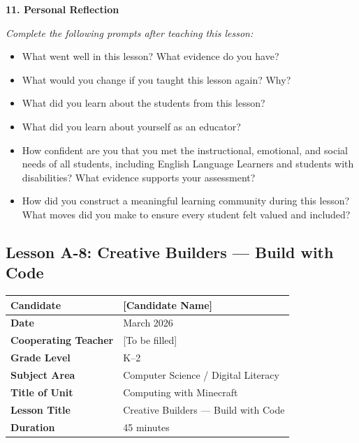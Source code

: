 \documentclass[11pt,letterpaper]{article}
\begin{document}
\textbf{11. Personal Reflection}

\textit{Complete the following prompts after teaching this lesson:}

\begin{itemize}
  \item What went well in this lesson? What evidence do you have?

  \item What would you change if you taught this lesson again? Why?

  \item What did you learn about the students from this lesson?

  \item What did you learn about yourself as an educator?

  \item How confident are you that you met the instructional, emotional, and social needs of all students, including English Language Learners and students with disabilities? What evidence supports your assessment?

  \item How did you construct a meaningful learning community during this lesson? What moves did you make to ensure every student felt valued and included?
\end{itemize}

\newpage
\subsection{Lesson A-8: Creative Builders --- Build with Code}
\label{sub:LessonA8CreativeBuildersBuildwithCode}

\begin{longtable}{|L{0.28\textwidth}|L{0.65\textwidth}|}
\hline
\textbf{Candidate}  & [Candidate Name]  \\
\hline
\textbf{Date}  & March 2026  \\
\hline
\textbf{Cooperating Teacher}  & [To be filled]  \\
\hline
\textbf{Grade Level}  & K--2  \\
\hline
\textbf{Subject Area}  & Computer Science / Digital Literacy  \\
\hline
\textbf{Title of Unit}  & Computing with Minecraft  \\
\hline
\textbf{Lesson Title}  & Creative Builders --- Build with Code  \\
\hline
\textbf{Duration}  & 45 minutes  \\
\hline
\end{longtable}
\end{document}

